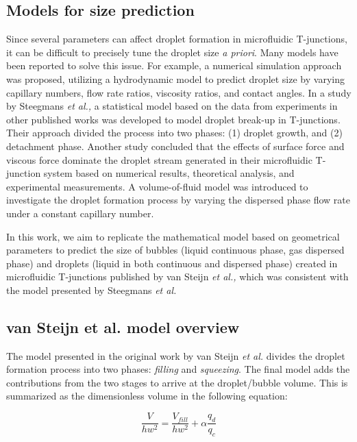 \subsection{Models for size prediction}

Since several parameters can affect droplet formation in microfluidic T-junctions, it
can be difficult to precisely tune the droplet size \emph{a priori}. Many models
have been reported to solve this issue. For example, a numerical simulation approach was proposed, utilizing a
hydrodynamic model to predict droplet size by varying capillary numbers,
flow rate ratios, viscosity ratios, and contact angles\supercite{liu_droplet_2009}.
In a study by Steegmans \emph{et al.,} a statistical model based on the data from
experiments in other published works was developed to model droplet break-up in T-junctions. Their approach divided
the process into two phases: (1) droplet growth, and (2) detachment phase\supercite{steegmans_generalised_2009}.
Another study concluded that the effects of surface force and viscous force dominate
the droplet stream generated in their microfluidic T-junction system based on numerical
results, theoretical analysis, and experimental measurements\supercite{li_study_2012}.
A volume-of-fluid model was introduced to investigate the droplet formation process
by varying the dispersed phase flow rate under a constant capillary
number\supercite{soh_numerical_2016}. 

In this work, we aim to replicate the mathematical model based on
geometrical parameters to predict the size of bubbles (liquid continuous phase, gas dispersed phase)
and droplets (liquid in both continuous and dispersed phase) created in
microfluidic T-junctions published by van Steijn \emph{et al.,}\supercite{van_steijn_predictive_2010}
which was consistent with the model presented by Steegmans \emph{et al.}

\subsection{van Steijn et al. model overview}

The model presented in the original work by van Steijn \emph{et al.}
divides the droplet formation process into two phases: \emph{filling} and \emph{squeezing}. The final model
adds the contributions from the two stages to arrive at the droplet/bubble volume.
This is summarized as the dimensionless volume in the following equation:

\begin{equation}
  \frac{V}{hw^2} = \frac{V_{fill}}{hw^{2}}+\alpha\frac{q_{d}}{q_{c}}
\end{equation}

